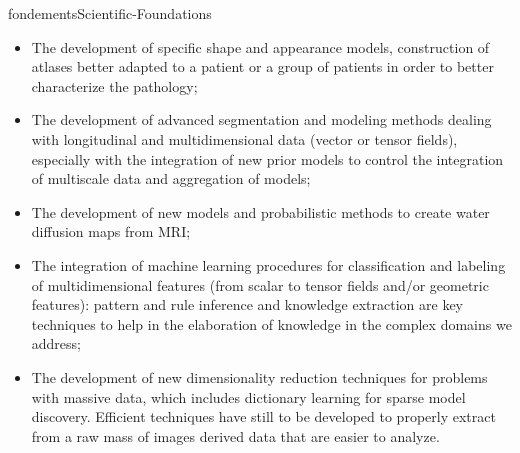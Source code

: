 \documentclass{ra2018}
\begin{document}
\begin{module}{fondements}{Scientific-Foundations}{}
        \begin{itemize}
          \item The development of specific shape and appearance models, construction
          of atlases better adapted to a patient or a group of patients in order to
          better characterize the pathology;
          \item The development of advanced segmentation and modeling methods dealing
          with longitudinal and multidimensional data (vector or tensor fields),
          especially with the integration of new prior models to control the
          integration of multiscale data and aggregation of models;
          \item The development of new models and probabilistic methods to create water
          diffusion maps from MRI;
          \item The integration of machine learning procedures for classification and
          labeling of multidimensional features (from scalar to tensor fields and/or
          geometric features): pattern and rule inference and knowledge extraction are
          key techniques to help in the elaboration of knowledge in the complex domains
          we address;
          \item The development of new dimensionality reduction techniques for problems
          with massive data, which includes dictionary learning for sparse model
          discovery. Efficient techniques have still to be developed to properly
          extract from a raw mass of images derived data that are easier to analyze.
        \end{itemize}
        \end{module}





  



\end{document}
